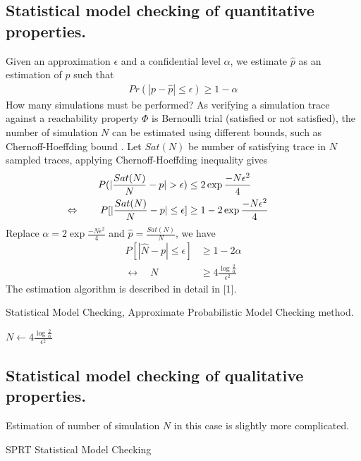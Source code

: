 \subsection{Statistical model checking of quantitative properties.}
Given an approximation $\epsilon$ and a confidential
level $\alpha$, we estimate $\hat{p}$ as an estimation of $p$ such that
\begin{align*}
    Pr(|p-\hat{p}| \leq \epsilon) \geq 1 - \alpha
\end{align*}
How many simulations must be performed?  As verifying a simulation trace against a reachability
property $\Phi$ is Bernoulli trial (satisfied or not satisfied), the number of simulation $N$ can be
estimated using different bounds, such as Chernoff-Hoeffding bound \cite{chernoff2014career}. Let
$Sat(N)$ be number of satisfying trace in $N$ sampled traces, applying Chernoff-Hoeffding inequality
gives
\begin{align*}
    P(|\frac{Sat(N)}{N}-p| > \epsilon)                                    & \leq 2\exp{\frac{-N\epsilon^2}{4}}     \\
    \llap{$\Leftrightarrow$ \qquad} P[|\frac{Sat(N)}{N}-p| \leq \epsilon] & \geq 1 - 2\exp{\frac{-N\epsilon^2}{4}}
\end{align*}
Replace $\alpha = 2\exp{\frac{-N\epsilon^2}{4}}$ and $\hat{p}=\frac{Sat(N)}{N}$, we have
\begin{align*}
    P[|\hat{N} - p| \leq \epsilon] & \geq 1 - 2\alpha                                \\
    \leftrightarrow \quad N        & \geq 4\frac{\log{\frac{2}{\alpha}}}{\epsilon^2}
\end{align*}
The estimation algorithm is described in detail in [1].
\begin{algorithm}[H]
    \caption{Statistical Model Checking, Approximate Probabilistic Model Checking method.}
    \label{alg:smc-apmc}
    \begin{algorithmic}[1]
        \State $N \leftarrow 4\frac{\log{\frac{2}{\alpha}}}{\epsilon^2}$
        \EndProcedure
    \end{algorithmic}
\end{algorithm}

\subsection{Statistical model checking of qualitative properties.}
Estimation of number of simulation $N$ in this case is slightly more complicated.
\begin{algorithm}[H]
    \caption{SPRT Statistical Model Checking}
    \label{alg:smc-sprt}
    \begin{algorithmic}[1]
        \EndProcedure
    \end{algorithmic}
\end{algorithm}

